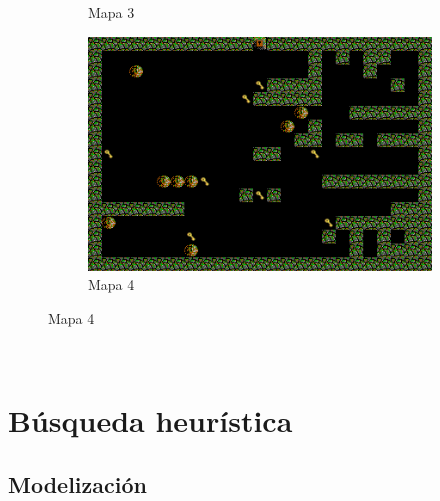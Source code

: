 \documentclass[11pt,spanish]{article}
\begin{document}
\begin{figure}[h!]
\begin{subfigure}[b]{0.40\linewidth}
					\caption{Mapa 3}
				\end{subfigure}
				\begin{subfigure}[b]{0.59\linewidth}
					\includegraphics[width=\linewidth]{sat/lab4.png}
					\caption{Mapa 4}
				\end{subfigure}
			\end{figure}
			\\
	\section{Búsqueda heurística}
		\subsection{Modelización}
\end{document}
